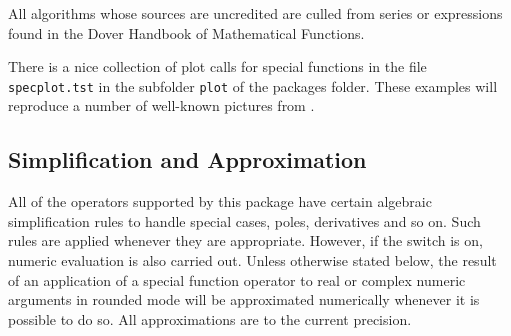 All algorithms whose sources are uncredited are culled from series or
expressions found in the Dover Handbook of Mathematical
Functions\cite{AbramowitzStegun:72}.

There is a nice collection of plot calls for special functions
in the file \texttt{specplot.tst} in the subfolder \texttt{plot} of the packages folder.
These examples will reproduce a number of well-known pictures from
\cite{AbramowitzStegun:72}.

\subsection{Simplification and Approximation}

All of the operators supported by this package have certain algebraic
simplification rules to handle special cases, poles, derivatives and so
on.  Such rules are applied whenever they are appropriate.  However, if
the  switch is on, numeric evaluation is also carried out.
Unless otherwise stated below, the result of an application of a special
function operator to real or complex numeric arguments in rounded mode
will be approximated numerically whenever it is possible to do so.  All
approximations are to the current precision.

